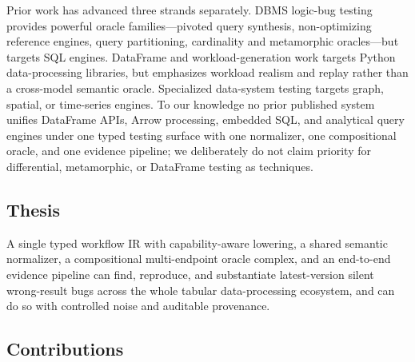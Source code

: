 Prior work has advanced three strands separately. DBMS logic-bug testing provides powerful
oracle families---pivoted query synthesis, non-optimizing reference engines, query
partitioning, cardinality and metamorphic oracles---but targets SQL engines. DataFrame and
workload-generation work targets Python data-processing libraries, but emphasizes workload
realism and replay rather than a cross-model semantic oracle. Specialized data-system testing
targets graph, spatial, or time-series engines. To our knowledge no prior published system
unifies DataFrame APIs, Arrow processing, embedded SQL, and analytical query engines under one
typed testing surface with one normalizer, one compositional oracle, and one evidence
pipeline; we deliberately do not claim priority for differential, metamorphic, or DataFrame
testing as techniques.

\subsection{Thesis}

A single typed workflow IR with capability-aware lowering, a shared semantic normalizer, a
compositional multi-endpoint oracle complex, and an end-to-end evidence pipeline can find,
reproduce, and substantiate latest-version silent wrong-result bugs across the whole tabular
data-processing ecosystem, and can do so with controlled noise and auditable provenance.

\subsection{Contributions}

